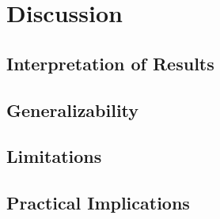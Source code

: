 \chapter{Discussion}
\label{chap:discussion}

\section{Interpretation of Results}
\label{sec:interpretation}


\section{Generalizability}
\label{sec:generalizability}


\section{Limitations}
\label{sec:limitations}


\section{Practical Implications}
\label{sec:implications}

